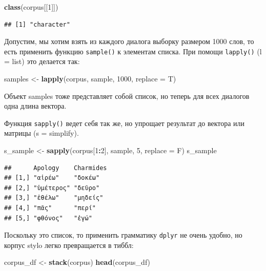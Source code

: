 \documentclass[
]{book}
\newenvironment{Shaded}{\begin{snugshade}}{\end{snugshade}}
\newcommand{\AttributeTok}[1]{\textcolor[rgb]{0.13,0.29,0.53}{#1}}
\newcommand{\DecValTok}[1]{\textcolor[rgb]{0.00,0.00,0.81}{#1}}
\newcommand{\FunctionTok}[1]{\textcolor[rgb]{0.13,0.29,0.53}{\textbf{#1}}}
\newcommand{\NormalTok}[1]{#1}
\newcommand{\OtherTok}[1]{\textcolor[rgb]{0.56,0.35,0.01}{#1}}
\newcommand{\SpecialCharTok}[1]{\textcolor[rgb]{0.81,0.36,0.00}{\textbf{#1}}}
\theoremstyle{definition}
\theoremstyle{definition}
\theoremstyle{definition}
\theoremstyle{definition}
\theoremstyle{remark}
\begin{document}
\begin{Shaded}
\begin{Highlighting}[]
\FunctionTok{class}\NormalTok{(corpus[[}\DecValTok{1}\NormalTok{]])}
\end{Highlighting}
\end{Shaded}

\begin{verbatim}
## [1] "character"
\end{verbatim}

Допустим, мы хотим взять из каждого диалога выборку размером 1000 слов, то есть применить функцию \texttt{sample()} к элементам списка. При помощи \texttt{lapply()} (l = list) это делается так:

\begin{Shaded}
\begin{Highlighting}[]
\NormalTok{samples }\OtherTok{\textless{}{-}} \FunctionTok{lapply}\NormalTok{(corpus, sample, }\DecValTok{1000}\NormalTok{, }\AttributeTok{replace =}\NormalTok{ T)}
\end{Highlighting}
\end{Shaded}

Объект samples тоже представляет собой список, но теперь для всех диалогов одна длина вектора.

Функция \texttt{sapply()} ведет себя так же, но упрощает результат до вектора или матрицы (s = simplify).

\begin{Shaded}
\begin{Highlighting}[]
\NormalTok{s\_sample }\OtherTok{\textless{}{-}} \FunctionTok{sapply}\NormalTok{(corpus[}\DecValTok{1}\SpecialCharTok{:}\DecValTok{2}\NormalTok{], sample, }\DecValTok{5}\NormalTok{, }\AttributeTok{replace =}\NormalTok{ F)}
\NormalTok{s\_sample}
\end{Highlighting}
\end{Shaded}

\begin{verbatim}
##      Apology    Charmides
## [1,] "αἱρέω"    "δοκέω"  
## [2,] "ὑμέτερος" "δεῦρο"  
## [3,] "ἐθέλω"    "μηδείς" 
## [4,] "πᾶς"      "περί"   
## [5,] "φθόνος"   "ἐγώ"
\end{verbatim}

Поскольку это список, то применить грамматику \texttt{dplyr} не очень удобно, но корпус stylo легко превращается в тиббл:

\begin{Shaded}
\begin{Highlighting}[]
\NormalTok{corpus\_df }\OtherTok{\textless{}{-}} \FunctionTok{stack}\NormalTok{(corpus)}
\FunctionTok{head}\NormalTok{(corpus\_df)}
\end{Highlighting}
\end{Shaded}
\end{document}
